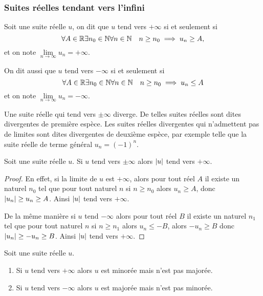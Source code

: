 \subsubsection{Suites réelles tendant vers l'infini}

\begin{defdef}
  Soit une suite réelle $u$, on dit que $u$ tend vers $+\infty$ si et seulement si
  \begin{equation}
    \forall A \in \mathbb{R} \exists n_0 \in \mathbb{N} \forall n \in \mathbb{N} \quad n \geq n_0 \implies u_n \geq A,
  \end{equation}
  et on note $\lim\limits_{n\to\infty}u_n=+\infty$. 

  On dit aussi que $u$ tend vers $-\infty$ si et seulement si
  \begin{equation}
    \forall A \in \mathbb{R} \exists n_0 \in \mathbb{N} \forall n \in \mathbb{N} \quad n \geq n_0 \implies u_n \leq A
  \end{equation}
  et on note $\lim\limits_{n\to\infty}u_n=-\infty$.
\end{defdef}
Une suite réelle qui tend vers $\pm\infty$ diverge. De telles suites réelles sont dites divergentes de première espèce. Les suites réelles divergentes qui n'admettent pas de limites sont dites divergentes de deuxième espèce, par exemple telle que la suite réelle de terme général $u_n=(-1)^n$.
\begin{prop}
  Soit une suite réelle $u$. Si $u$ tend vers $\pm\infty$ alors $\left\lvert u\right\rvert$ tend vers $+\infty$.
\end{prop}
\begin{proof}
  En effet, si la limite de $u$ est $+\infty$, alors pour tout réel $A$ il existe un naturel $n_0$  tel que pour tout naturel $n$ si $n \geq n_0$ alors $u_n \geq A$, donc $\left\lvert u_n\right\rvert \geq u_n \geq A$. Ainsi $\left\lvert u\right\rvert$ tend vers $+\infty$. 

  De la même manière si $u$ tend $-\infty$ alors  pour tout réel $B$ il existe un naturel $n_1$  tel que pour tout naturel $n$ si $n \geq n_1$ alors $u_n \leq -B$, alors $-u_n \geq B$ donc $\left\lvert u_n\right\rvert \geq -u_n \geq B$. Ainsi $\left\lvert u\right\rvert$ tend vers $+\infty$. 
\end{proof}
\begin{prop}
  Soit une suite réelle $u$.
  \begin{enumerate}
  \item Si $u$ tend vers $+\infty$ alors $u$ est minorée mais n'est pas majorée.
  \item Si $u$ tend vers $-\infty$ alors $u$ est majorée mais n'est pas minorée.
  \end{enumerate}
\end{prop}
